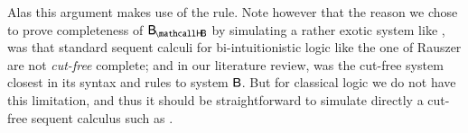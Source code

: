 Alas this argument makes use of the  rule. Note however that
the reason we chose to prove completeness of $\sysBHB$ by simulating a rather
exotic system like , was that standard sequent calculi for
bi-intuitionistic logic like the one of Rauszer
 are not \emph{cut-free} complete; and in
our literature review,  was the cut-free system closest in its
syntax and rules to system $\sysB$. But for classical logic we do not have this
limitation, and thus it should be straightforward to simulate directly a
cut-free sequent calculus such as .